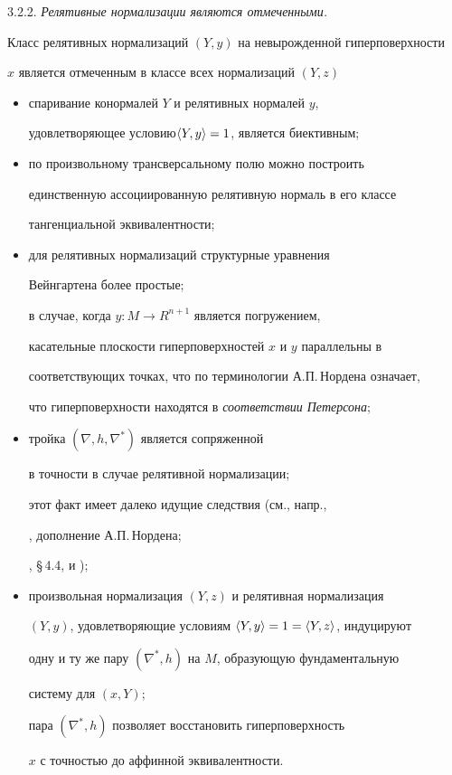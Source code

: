 3.2.2. {\it Релятивные нормализации являются отмеченными.}


Класс релятивных нормализаций $(Y,y)$ на невырожденной гиперповерхности


$x$ является отмеченным в классе всех нормализаций $(Y,z)$


\begin{itemize}


\item[(A)] спаривание конормалей $Y$ и релятивных нормалей $y$,


удовлетворяющее условию\linebreak $\langle Y,y\rangle = 1$, является биективным;


\item[(B)] по произвольному трансверсальному полю можно построить


единственную ассоциированную релятивную нормаль в его классе


тангенциальной эквивалентности;


\item[(C)] для релятивных нормализаций структурные уравнения


Вейнгартена более простые;


в случае, когда $y:M \to R^{n+1}$ является погружением,


касательные плоскости гиперповерхностей $x$ и $y$ параллельны в


соответствующих точках, что по терминологии А.П.\,Нордена означает,


что гиперповерхности находятся в {\it соответствии Петерсона};


\item[(D)] тройка $(\nabla , h, \nabla ^*)$ является сопряженной


в точности в случае релятивной нормализации;


этот факт имеет далеко идущие следствия (см., напр.,


\cite{SCHI}, дополнение А.П.\,Нордена; 


\cite{SIM-S-V}, \S\,4.4, и \cite{NOM-SI});


\item[(E)] произвольная нормализация $(Y,z)$ и релятивная нормализация


$(Y,y)$, удовлетворяющие условиям $\langle Y,y\rangle = 1 = \langle Y,z\rangle $, индуцируют


одну и ту же пару $(\nabla ^*, h)$ на $M$, образующую фундаментальную


систему для $(x,Y)$;


пара $(\nabla ^*, h)$ позволяет восстановить гиперповерхность


$x$ с точностью до аффинной эквивалентности.


\end{itemize}





